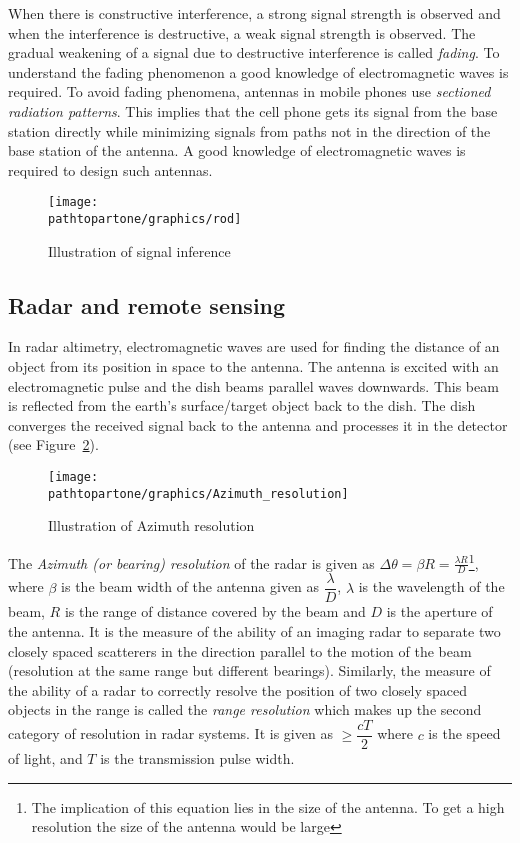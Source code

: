 When there is constructive interference, a strong signal strength is observed and when the interference is destructive, a weak signal strength is observed. The gradual weakening of a signal due to destructive interference is called \textit{fading}. To understand the fading phenomenon a good knowledge of electromagnetic waves is required. To avoid fading phenomena, antennas in mobile phones use \textit{sectioned radiation patterns}. This implies that the cell phone gets its signal from the base station directly while minimizing signals from paths not in the direction of the base station of the antenna. A good knowledge of electromagnetic waves is required to design such antennas.
\begin{figure}[h]
\centering
\texttt{[image: \\pathtopartone/graphics/rod]}
\caption{Illustration of signal inference}
\label{fig:rod}
\end{figure}

\subsection{Radar and remote sensing}
In radar altimetry, electromagnetic waves are used for finding the distance of an object from its position in space to the antenna. The antenna is excited with an electromagnetic pulse and the dish beams parallel waves downwards. This beam is reflected from the earth's surface/target object back to the dish. The dish converges the received signal back to the antenna and processes it in the detector (see Figure~\ref{fig:new}).
\begin{figure}[h]
\centering
\texttt{[image: \\pathtopartone/graphics/Azimuth\_resolution]}
\caption{Illustration of Azimuth resolution}
\label{fig:new}
\end{figure}

The \textit{Azimuth (or bearing) resolution} of the radar is given as $\Delta \theta = \beta R = \frac{\lambda R}{D}$\footnote{The implication of this equation lies in the size of the antenna. To get a high resolution the size of the antenna would be large}, where $\beta$ is the beam width of the antenna given as $\dfrac{\lambda}{D}$, $\lambda$ is the wavelength of the beam, $R$ is the range of distance covered by the beam and $D$ is the aperture of the antenna. It is the measure of the ability of an imaging radar to separate two closely spaced scatterers in the direction parallel to the motion of the beam (resolution at the same range but different bearings). Similarly, the measure of the ability of a radar to correctly resolve the position of two closely spaced objects in the range is called the \textit{range resolution} which makes up the second category of resolution in radar systems. It is given as $\geq \dfrac{cT}{2}$ where $c$ is the speed of light, and $T$ is the transmission pulse width.

